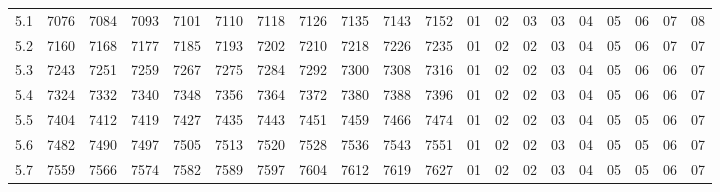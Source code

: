 \documentclass[12pt,UTF8]{ctexbook}
\begin{document}
\begin{appendix}
\begin{longtable}{|c| c c c c c | c c c c c| c c c c c c c c c|}
\scriptsize 5.1 & \scriptsize 7076 & \scriptsize 7084 & \scriptsize 7093 & \scriptsize 7101 & \scriptsize 7110 & \scriptsize 7118 & \scriptsize 7126 & \scriptsize 7135 & \scriptsize 7143 & \scriptsize 7152 & \scriptsize 01 & \scriptsize 02 & \scriptsize 03 & \scriptsize 03 & \scriptsize 04 & \scriptsize 05 & \scriptsize 06 & \scriptsize 07 & \scriptsize 08 \\
\scriptsize 5.2 & \scriptsize 7160 & \scriptsize 7168 & \scriptsize 7177 & \scriptsize 7185 & \scriptsize 7193 & \scriptsize 7202 & \scriptsize 7210 & \scriptsize 7218 & \scriptsize 7226 & \scriptsize 7235 & \scriptsize 01 & \scriptsize 02 & \scriptsize 02 & \scriptsize 03 & \scriptsize 04 & \scriptsize 05 & \scriptsize 06 & \scriptsize 07 & \scriptsize 07 \\
\scriptsize 5.3 & \scriptsize 7243 & \scriptsize 7251 & \scriptsize 7259 & \scriptsize 7267 & \scriptsize 7275 & \scriptsize 7284 & \scriptsize 7292 & \scriptsize 7300 & \scriptsize 7308 & \scriptsize 7316 & \scriptsize 01 & \scriptsize 02 & \scriptsize 02 & \scriptsize 03 & \scriptsize 04 & \scriptsize 05 & \scriptsize 06 & \scriptsize 06 & \scriptsize 07 \\
\scriptsize 5.4 & \scriptsize 7324 & \scriptsize 7332 & \scriptsize 7340 & \scriptsize 7348 & \scriptsize 7356 & \scriptsize 7364 & \scriptsize 7372 & \scriptsize 7380 & \scriptsize 7388 & \scriptsize 7396 & \scriptsize 01 & \scriptsize 02 & \scriptsize 02 & \scriptsize 03 & \scriptsize 04 & \scriptsize 05 & \scriptsize 06 & \scriptsize 06 & \scriptsize 07 \\
\scriptsize 5.5 & \scriptsize 7404 & \scriptsize 7412 & \scriptsize 7419 & \scriptsize 7427 & \scriptsize 7435 & \scriptsize 7443 & \scriptsize 7451 & \scriptsize 7459 & \scriptsize 7466 & \scriptsize 7474 & \scriptsize 01 & \scriptsize 02 & \scriptsize 02 & \scriptsize 03 & \scriptsize 04 & \scriptsize 05 & \scriptsize 05 & \scriptsize 06 & \scriptsize 07 \\
\scriptsize 5.6 & \scriptsize 7482 & \scriptsize 7490 & \scriptsize 7497 & \scriptsize 7505 & \scriptsize 7513 & \scriptsize 7520 & \scriptsize 7528 & \scriptsize 7536 & \scriptsize 7543 & \scriptsize 7551 & \scriptsize 01 & \scriptsize 02 & \scriptsize 02 & \scriptsize 03 & \scriptsize 04 & \scriptsize 05 & \scriptsize 05 & \scriptsize 06 & \scriptsize 07 \\
\scriptsize 5.7 & \scriptsize 7559 & \scriptsize 7566 & \scriptsize 7574 & \scriptsize 7582 & \scriptsize 7589 & \scriptsize 7597 & \scriptsize 7604 & \scriptsize 7612 & \scriptsize 7619 & \scriptsize 7627 & \scriptsize 01 & \scriptsize 02 & \scriptsize 02 & \scriptsize 03 & \scriptsize 04 & \scriptsize 05 & \scriptsize 05 & \scriptsize 06 & \scriptsize 07 \\

\end{longtable}
\end{appendix}
\end{document}
